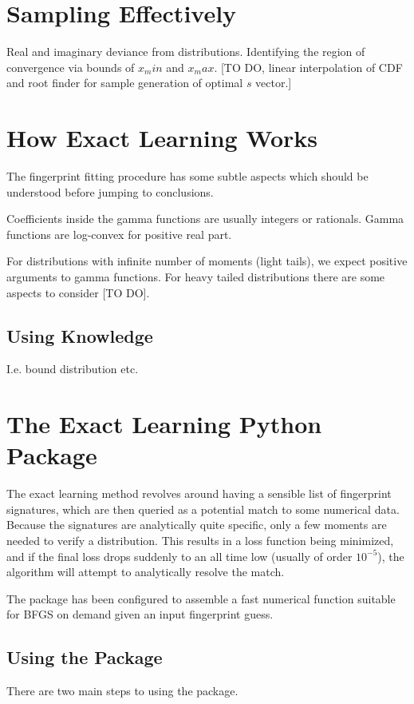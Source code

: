 \documentclass{article}
\begin{document}
\section{Sampling Effectively}
Real and imaginary deviance from distributions. Identifying the region of convergence via bounds of $x_min$ and $x_max$. [TO DO, linear interpolation of CDF and root finder for sample generation of optimal $s$ vector.]





\section{How Exact Learning Works}
The fingerprint fitting procedure has some subtle aspects which should be understood before jumping to conclusions.


Coefficients inside the gamma functions are usually integers or rationals.
Gamma functions are log-convex for positive real part.

For distributions with infinite number of moments (light tails), we expect positive arguments to gamma functions. For heavy tailed distributions there are some aspects to consider [TO DO].


\subsection{Using Knowledge}
I.e. bound distribution etc.



\section{The Exact Learning Python Package}
The exact learning method revolves around having a sensible list of fingerprint signatures, which are then queried as a potential match to some numerical data. Because the signatures are analytically quite specific, only a few moments are needed to verify a distribution. This results in a loss function being minimized, and if the final loss drops suddenly to an all time low (usually of order $10^{-5}$), the algorithm will attempt to analytically resolve the match. 

The package has been configured to assemble a fast numerical function suitable for BFGS on demand given an input fingerprint guess.

\subsection{Using the Package}
There are two main steps to using the package.
\end{document}
